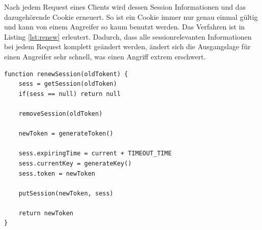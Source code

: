 Nach jedem Request eines Clients wird dessen Session Informationen und das dazugehörende Cookie
erneuert. So ist ein Cookie immer nur genau einmal gültig und kann von einem Angreifer so kaum 
benutzt werden. Das Verfahren ist in Listing \ref{lst:renew} erleutert. Dadurch, dass alle 
sessionrelevanten Informationen bei jedem Request komplett geändert werden, ändert sich die
Ausgangslage für einen Angreifer sehr schnell, was einen Angriff extrem erschwert.
\newline
\begin{lstlisting}[caption=Erneuern einer Session,label={lst:renew}]
function renewSession(oldTokent) {
    sess = getSession(oldToken)
    if(sess == null) return null

    removeSession(oldToken)

    newToken = generateToken()

    sess.expiringTime = current + TIMEOUT_TIME
    sess.currentKey = generateKey()
    sess.token = newToken

    putSession(newToken, sess)

    return newToken
}
\end{lstlisting}
